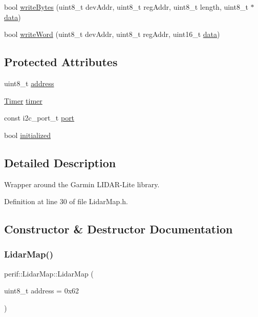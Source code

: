 \begin{DoxyCompactItemize}
\item 
bool \mbox{\hyperlink{classI2Cdev_aa4e39cac6c0eac5112f9132084bcc93e}{write\+Bytes}} (uint8\+\_\+t dev\+Addr, uint8\+\_\+t reg\+Addr, uint8\+\_\+t length, uint8\+\_\+t $\ast$\mbox{\hyperlink{classperif_1_1PerifBase_a1a3afaa535fda17e9f97123fffe78765}{data}})
\item 
bool \mbox{\hyperlink{classI2Cdev_acbe68a802d6a177301736e60bedd1def}{write\+Word}} (uint8\+\_\+t dev\+Addr, uint8\+\_\+t reg\+Addr, uint16\+\_\+t \mbox{\hyperlink{classperif_1_1PerifBase_a1a3afaa535fda17e9f97123fffe78765}{data}})
\end{DoxyCompactItemize}
\subsection*{Protected Attributes}
\begin{DoxyCompactItemize}
\item 
uint8\+\_\+t \mbox{\hyperlink{classperif_1_1I2CPerif_a3275bcc89b3d8ddfa221fb76669c2d45}{address}}
\item 
\mbox{\hyperlink{classTimer}{Timer}} \mbox{\hyperlink{classperif_1_1Perif_acfa1256201bead82ccce1a0a8bcc24e1}{timer}}
\item 
const i2c\+\_\+port\+\_\+t \mbox{\hyperlink{classI2Cdev_a1d1e63732aa9f50369172b27a034129c}{port}}
\item 
bool \mbox{\hyperlink{classI2Cdev_a94b914bfcbd0fe1f6fdd7b9c6f4ab921}{initialized}}
\end{DoxyCompactItemize}


\subsection{Detailed Description}
Wrapper around the Garmin L\+I\+D\+A\+R-\/\+Lite library. 

Definition at line 30 of file Lidar\+Map.\+h.



\subsection{Constructor \& Destructor Documentation}
\mbox{\label{classperif_1_1LidarMap_a71c6c227c929dcefebd8055dc00084c1}} 
\subsubsection{\texorpdfstring{LidarMap()}{LidarMap()}}
{\footnotesize\ttfamily perif\+::\+Lidar\+Map\+::\+Lidar\+Map (\begin{DoxyParamCaption}\item[{uint8\+\_\+t}]{address = {\ttfamily 0x62} }\end{DoxyParamCaption})\hspace{0.3cm}{\ttfamily [explicit]}}


